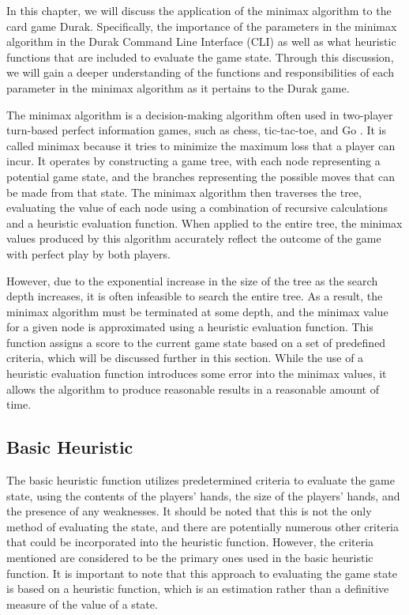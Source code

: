 In this chapter, we will discuss the application of the minimax algorithm to the card game Durak. Specifically, the importance of the parameters in the minimax algorithm in the Durak Command Line Interface (CLI) as well as what heuristic functions that are included to evaluate the game state. Through this discussion, we will gain a deeper understanding of the functions and responsibilities of each parameter in the minimax algorithm as it pertains to the Durak game.

The minimax algorithm is a decision-making algorithm often used in two-player turn-based perfect information games, such as chess, tic-tac-toe, and Go \citep{AI4Ed}. It is called minimax because it tries to minimize the maximum loss that a player can incur. It operates by constructing a game tree, with each node representing a potential game state, and the branches representing the possible moves that can be made from that state. The minimax algorithm then traverses the tree, evaluating the value of each node using a combination of recursive calculations and a heuristic evaluation function. When applied to the entire tree, the minimax values produced by this algorithm accurately reflect the outcome of the game with perfect play by both players.

However, due to the exponential increase in the size of the tree as the search depth increases, it is often infeasible to search the entire tree. As a result, the minimax algorithm must be terminated at some depth, and the minimax value for a given node is approximated using a heuristic evaluation function. This function assigns a score to the current game state based on a set of predefined criteria, which will be discussed further in this section. While the use of a heuristic evaluation function introduces some error into the minimax values, it allows the algorithm to produce reasonable results in a reasonable amount of time.

\subsection{Basic Heuristic}
The basic heuristic function utilizes predetermined criteria to evaluate the game state, using the contents of the players' hands, the size of the players' hands, and the presence of any weaknesses. It should be noted that this is not the only method of evaluating the state, and there are potentially numerous other criteria that could be incorporated into the heuristic function. However, the criteria mentioned are considered to be the primary ones used in the basic heuristic function. It is important to note that this approach to evaluating the game state is based on a heuristic function, which is an estimation rather than a definitive measure of the value of a state.

